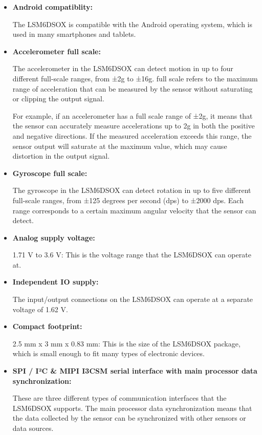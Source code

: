 \begin{itemize}
	
	\item  \textbf{Android compatiblity:}
	
	The LSM6DSOX is compatible with the Android operating system, which is used in many smartphones and tablets.
	
	
	\item  \textbf{Accelerometer full scale: }
	
	The accelerometer in the LSM6DSOX can detect motion in up to four different full-scale ranges, from ±2g to ±16g. full scale refers to the maximum range of acceleration that can be measured by the sensor without saturating or clipping the output signal. 
	
	\bigskip
	
	For example, if an accelerometer has a full scale range of ±2g,\cite{Liu:2022} it means that the sensor can accurately measure accelerations up to 2g in both the positive and negative directions. If the measured acceleration exceeds this range, the sensor output will saturate at the maximum value, which may cause distortion in the output signal.
	
	\item  \textbf{Gyroscope full scale: }
	
	The gyroscope in the LSM6DSOX can detect rotation in up to five different full-scale ranges, from ±125 degrees per second (dps) to ±2000 dps. Each range corresponds to a certain maximum angular velocity that the sensor can detect.
	
	\item  \textbf{Analog supply voltage: }
	
	1.71 V to 3.6 V: This is the voltage range that the LSM6DSOX can operate at.
	
	\item  \textbf{Independent IO supply: }
	
	The input/output connections on the LSM6DSOX can operate at a separate voltage of 1.62 V.
	
	\item  \textbf{Compact footprint: }
	
	2.5 mm x 3 mm x 0.83 mm: This is the size of the LSM6DSOX package, which is small enough to fit many types of electronic devices.
	
	
	\item  \textbf{SPI / I²C \& MIPI I3CSM serial interface with main processor data synchronization:}
	
	These are three different types of communication interfaces that the LSM6DSOX supports. The main processor data synchronization means that the data collected by the sensor can be synchronized with other sensors or data sources.
	

\end{itemize}
